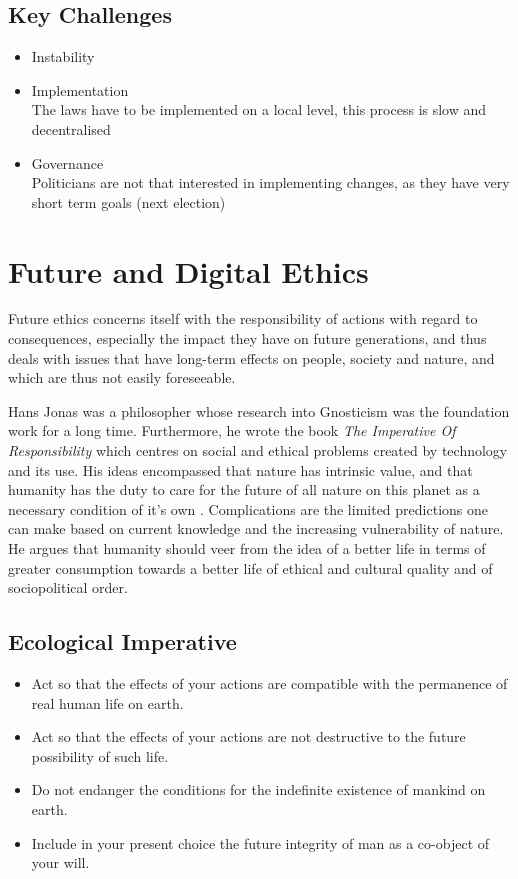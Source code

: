 \documentclass[11pt]{article}
\theoremstyle{definition}
\begin{document}
\subsection{Key Challenges}
\begin{itemize}
	\item Instability
	\item Implementation\\The laws have to be implemented on a local level, this process is slow and decentralised
	\item Governance\\Politicians are not that interested in implementing changes, as they have very short term goals (next election)
\end{itemize}

\section{Future and Digital Ethics}
Future ethics concerns itself with the responsibility of actions with regard to consequences, especially the impact they have on future generations, and thus deals with issues that have long-term effects on people, society and nature, and which are thus not easily foreseeable.

Hans Jonas was a philosopher whose research into Gnosticism was the foundation work for a long time. Furthermore, he wrote the book \textit{The Imperative Of Responsibility} which centres on social and ethical problems created by technology and its use. His ideas encompassed that nature has intrinsic value, and that humanity has the duty to care for the future of all nature on this planet as a necessary condition of it's own \parencite{jonas1984imperative}. Complications are the limited predictions one can make based on current knowledge and the increasing vulnerability of nature. He argues that humanity should veer from the idea of a better life in terms of greater consumption towards a better life of ethical and cultural quality and of sociopolitical order.

\subsection{Ecological Imperative}
\begin{itemize}[label=-]
	\item Act so that the effects of your actions are compatible with the permanence of real human life on earth.
	\item Act so that the effects of your actions are not destructive to the future possibility of such life.
	\item Do not endanger the conditions for the indefinite existence of mankind on earth.
	\item Include in your present choice the future integrity of man as a co-object of your will.
\end{itemize}
\end{document}
